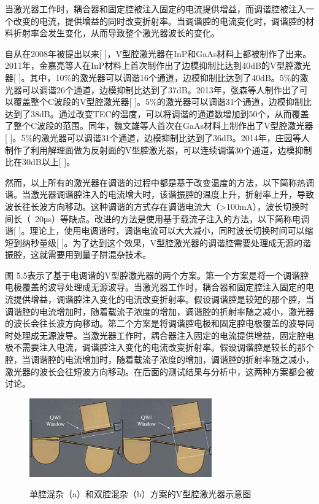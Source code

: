 \documentclass{ZJUthesis}
\begin{document}
当激光器工作时，耦合器和固定腔被注入固定的电流提供增益，而调谐腔被注入一个改变的电流，提供增益的同时改变折射率。当调谐腔的电流变化时，调谐腔的材料折射率会发生变化，从而导致整个激光器波长的变化。

自从在2008年被提出以来[ ]，V型腔激光器在InP和GaAs材料上都被制作了出来。2011年，金嘉亮等人在InP材料上首次制作出了边模抑制比达到40dB的V型腔激光器[ ]。其中，10\%的激光器可以调谐16个通道，边模抑制比达到了40dB。5\%的激光器可以调谐26个通道，边模抑制比达到了37dB。2013年，张森等人制作出了可以覆盖整个C波段的V型腔激光器[ ]。5\%的激光器可以调谐31个通道，边模抑制比达到了38dB。通过改变TEC的温度，可以将调谐的通道数增加到50个，从而覆盖了整个C波段的范围。同年，魏文雄等人首次在GaAs材料上制作出了V型腔激光器[ ]。5\%的激光器可以调谐31个通道，边模抑制比达到了36dB。2014年，庄园等人制作了利用解理面做为反射面的V型腔激光器，可以连续调谐30个通道，边模抑制比在30dB以上[ ]。

然而，以上所有的激光器在调谐的过程中都是基于改变温度的方法，以下简称热调谐。当激光器调谐腔注入的电流增大时，该谐振腔的温度上升，折射率上升，导致波长往长波方向移动。这种调谐的方式存在调谐电流大（>100mA），波长切换时间长（~20μs）等缺点。改进的方法是使用基于载流子注入的方法，以下简称电调谐[ ]。理论上，使用电调谐时，调谐电流可以大大减小，同时波长切换时间可以缩短到纳秒量级[ ]。为了达到这个效果，V型腔激光器的调谐腔需要处理成无源的谐振腔，这就需要用到量子阱混杂技术。

图 5.5表示了基于电调谐的V型腔激光器的两个方案。第一个方案是将一个调谐腔电极覆盖的波导处理成无源波导。当激光器工作时，耦合器和固定腔注入固定的电流提供增益，调谐腔注入变化的电流改变折射率。假设调谐腔是较短的那个腔，当调谐腔的电流增加时，随着载流子浓度的增加，调谐腔的折射率随之减小，激光器的波长会往长波方向移动。第二个方案是将调谐腔电极和固定腔电极覆盖的波导同时处理成无源波导。当激光器工作时，耦合器注入固定的电流提供增益，固定腔电极不需要注入电流，调谐腔注入变化的电流改变折射率。假设调谐腔是较长的那个腔，当调谐腔的电流增加时，随着载流子浓度的增加，调谐腔的折射率随之减小，激光器的波长会往短波方向移动。在后面的测试结果与分析中，这两种方案都会被讨论。

\begin{figure}[!ht]
  \centering
  \includegraphics[width=0.7\textwidth]{./Pictures/vccl_qwi_strategies.eps}\\
  \caption{单腔混杂（a）和双腔混杂（b）方案的V型腔激光器示意图}
  \label{fig_vccl_qwi_strategies}
\end{figure}
\end{document}
